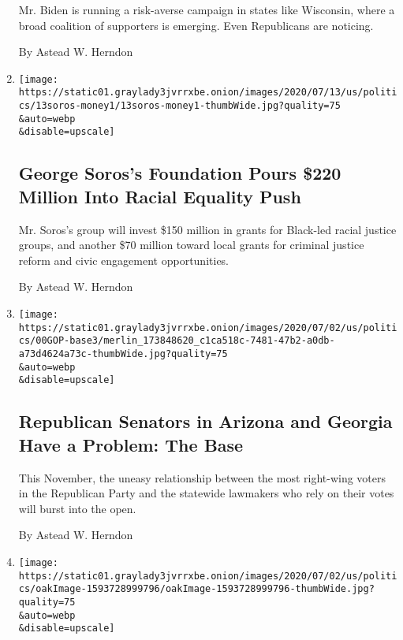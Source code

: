 \begin{enumerate}
  Mr. Biden is running a risk-averse campaign in states like Wisconsin,
  where a broad coalition of supporters is emerging. Even Republicans
  are noticing.

  By Astead W. Herndon
\item
  \href{/2020/07/13/us/politics/george-soros-racial-justice-organizations.html}{}

  \texttt{[image: https://static01.graylady3jvrrxbe.onion/images/2020/07/13/us/politics/13soros-money1/13soros-money1-thumbWide.jpg?quality=75\\\&auto=webp\\\&disable=upscale]}

  \hypertarget{george-soross-foundation-pours-220-million-into-racial-equality-push}{%
  \subsection{George Soros's Foundation Pours \$220 Million Into Racial
  Equality
  Push}\label{george-soross-foundation-pours-220-million-into-racial-equality-push}}

  Mr. Soros's group will invest \$150 million in grants for Black-led
  racial justice groups, and another \$70 million toward local grants
  for criminal justice reform and civic engagement opportunities.

  By Astead W. Herndon
\item
  \href{/2020/07/09/us/politics/kelly-loeffler-georgia-senate-arizona.html}{}

  \texttt{[image: https://static01.graylady3jvrrxbe.onion/images/2020/07/02/us/politics/00GOP-base3/merlin\_173848620\_c1ca518c-7481-47b2-a0db-a73d4624a73c-thumbWide.jpg?quality=75\\\&auto=webp\\\&disable=upscale]}

  \hypertarget{republican-senators-in-arizona-and-georgia-have-a-problem-the-base}{%
  \subsection{Republican Senators in Arizona and Georgia Have a Problem:
  The
  Base}\label{republican-senators-in-arizona-and-georgia-have-a-problem-the-base}}

  This November, the uneasy relationship between the most right-wing
  voters in the Republican Party and the statewide lawmakers who rely on
  their votes will burst into the open.

  By Astead W. Herndon
\item
  \href{/2020/07/02/us/politics/waukesha-wisconsin-biden-trump.html}{}

  \texttt{[image: https://static01.graylady3jvrrxbe.onion/images/2020/07/02/us/politics/oakImage-1593728999796/oakImage-1593728999796-thumbWide.jpg?quality=75\\\&auto=webp\\\&disable=upscale]}


\end{enumerate}
